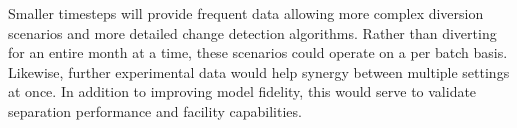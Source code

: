 Smaller timesteps will provide frequent data allowing more complex diversion scenarios and more detailed change detection algorithms. Rather than diverting for an entire month at a time,
these scenarios could operate on a per batch basis. Likewise, further experimental data would help synergy between multiple settings at once. In addition to improving model fidelity,
this would serve to validate separation performance and facility capabilities.  
